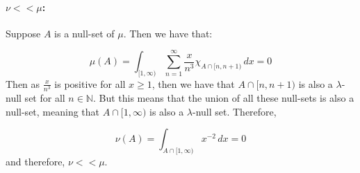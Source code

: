 \documentclass{article}
\theoremstyle{definition}
\numberwithin{theorem}{section}
\numberwithin{equation}{section}
\begin{document}
\paragraph{$\nu << \mu$:}

Suppose $A$ is a null-set of $\mu$. Then we have that:

\begin{equation}
	\mu(A) = \int_{[1, \infty)}\sum_{n = 1}^{\infty} \frac{x}{n^3} \chi_{A\cap [n, n + 1)} \, dx  = 0
\end{equation}
Then as $\frac{x}{n^3}$ is positive for all $x \geq 1$, then we have that $A \cap [n, n + 1)$ is also a $\lambda$-null set for all $n \in \mathbb{N}$. But this means that the union of all these null-sets is also a null-set, meaning that $A \cap [1, \infty)$ is also a $\lambda$-null set. Therefore, 

\begin{equation}
	\nu(A) = \int_{A \cap [1, \infty)} x^{-2} \, dx = 0
\end{equation}
and therefore, $\nu << \mu$.
\end{document}
